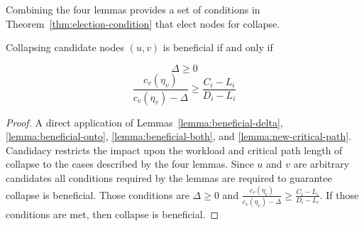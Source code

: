 Combining the four lemmas provides a set of conditions in
Theorem~\ref{thm:election-condition} that elect nodes for collapse.

\begin{theorem}[Election]\label{thm:election-condition}
  Collapsing candidate nodes ${(u,v)}$ is beneficial if and only if

  \begin{multicols}{2}
    \begin{equation*}
      \Delta \ge 0
    \end{equation*}
    \begin{equation*}
      \frac{c_v(\eta_v)}{c_v(\eta_v) - \Delta} \ge
      \frac{C_i - L_i}{D_i - L_i}
    \end{equation*}
  \end{multicols}

  \begin{proof}
    A direct application of Lemmas~\ref{lemma:beneficial-delta},
    \ref{lemma:beneficial-onto}, \ref{lemma:beneficial-both},
    and \ref{lemma:new-critical-path}. Candidacy restricts the
    impact upon the workload and critical path length of collapse to
    the cases described by the four lemmas. Since ${u}$ and ${v}$ are
    arbitrary candidates all conditions required by the lemmas are
    required to guarantee collapse is beneficial. Those conditions are
    ${\Delta \ge 0}$ and ${\frac{c_v(\eta_v)}{c_v(\eta_v) - \Delta} \ge
      \frac{C_i - L_i}{D_i - L_i}}$. If those conditions are met, then
    collapse is beneficial.
  \end{proof}
\end{theorem}
